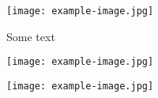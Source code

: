\documentclass{article}
\begin{document}
\begin{center}
\texttt{[image: example-image.jpg]}
\end{center}
Some text
\begin{center}
\texttt{[image: example-image.jpg]}
\end{center}

\begin{center}
\texttt{[image: example-image.jpg]}
\end{center}
\end{document}
